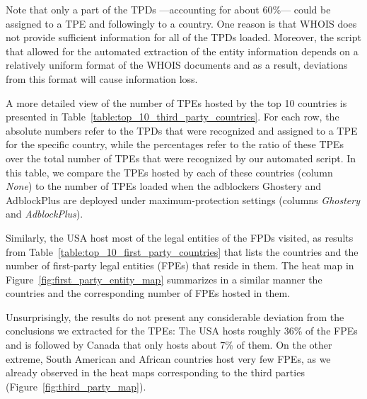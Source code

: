 Note that only a part of the TPDs ---accounting for about 60\%--- could be assigned to a TPE and followingly to a country. One reason is that WHOIS does not provide sufficient information for all of the TPDs loaded. Moreover, the script that allowed for the automated extraction of the entity information depends on a relatively uniform format of the WHOIS documents and as a result, deviations from this format will cause information loss.

A more detailed view of the number of TPEs hosted by the top 10 countries is presented in Table~\ref{table:top_10_third_party_countries}. For each row, the absolute numbers refer to the TPDs that were recognized and assigned to a TPE for the specific country, while the percentages refer to the ratio of these TPEs over the total number of TPEs that were recognized by our automated script. In this table, we compare the TPEs hosted by each of these countries (column \textit{None}) to the number of TPEs loaded when the adblockers Ghostery and AdblockPlus are deployed under maximum-protection settings (columns \textit{Ghostery} and \textit{AdblockPlus}).

Similarly, the USA host most of the legal entities of the FPDs visited, as results from Table~\ref{table:top_10_first_party_countries} that lists the countries and the number of first-party legal entities (FPEs) that reside in them. The heat map in Figure~\ref{fig:first_party_entity_map} summarizes in a similar manner the countries and the corresponding number of FPEs hosted in them.

Unsurprisingly, the results do not present any considerable deviation from the conclusions we extracted for the TPEs: The USA hosts roughly 36\% of the FPEs and is followed by Canada that only hosts about 7\% of them. On the other extreme, South American and African countries host very few FPEs, as we already observed in the heat maps corresponding to the third parties (Figure~\ref{fig:third_party_map}).

